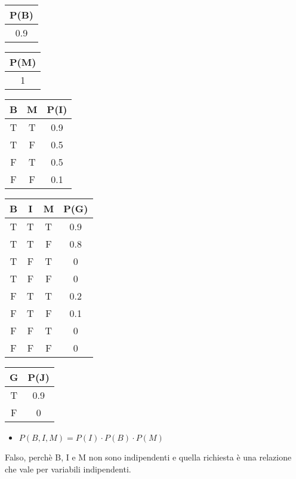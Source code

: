 \documentclass{article}
\begin{document}
\begin{minipage}{4cm}
	\begin{tabular}{|c|}
		\hline
		P(B) \\ \hline
		0.9  \\ \hline
	\end{tabular}
\end{minipage}
\begin{minipage}{4cm}
	\begin{tabular}{|c|}
		\hline
		P(M) \\ \hline
		1    \\ \hline
	\end{tabular}
\end{minipage}
\begin{minipage}{4cm}
\begin{tabular}{|c|c|c|}
	\hline
	B & M & P(I) \\ \hline
	T & T & 0.9  \\ \hline
	T & F & 0.5  \\ \hline
	F & T & 0.5  \\ \hline
	F & F & 0.1  \\ \hline
\end{tabular}
\end{minipage}
\begin{minipage}{4cm}
\begin{tabular}{|c|c|c|c|}
	\hline
	B & I & M & P(G) \\ \hline
	T & T & T & 0.9  \\ \hline
	T & T & F & 0.8  \\ \hline
	T & F & T & 0    \\ \hline
	T & F & F & 0    \\ \hline
	F & T & T & 0.2  \\ \hline
	F & T & F & 0.1  \\ \hline
	F & F & T & 0    \\ \hline
	F & F & F & 0    \\ \hline
\end{tabular}
\end{minipage}
\begin{tabular}{|c|c|}
	\hline
	G & P(J) \\ \hline
	T & 0.9  \\ \hline
	F & 0    \\ \hline
\end{tabular}

\begin{itemize}
	\item \(P(B,I,M) = P(I) \cdot P(B) \cdot P(M) \)
\end{itemize}
Falso, perchè B, I e M non sono indipendenti e quella richiesta è una relazione che vale per variabili indipendenti.
\end{document}
